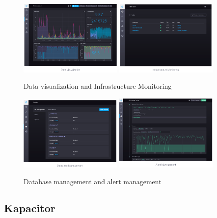 \documentclass{article}
\begin{document}
\begin{figure}[H]
    \centering
    \includegraphics[width=0.45\textwidth]{chronograf-data-visualization.png}
    \includegraphics[width=0.45\textwidth]{chronograf-infrastructure-monitoring.png}
    \caption{Data visualization and Infrastructure Monitoring}
\end{figure}

\begin{figure}[H]
    \centering
    \includegraphics[width=0.45\textwidth]{chronograf-database-management.png}
    \includegraphics[width=0.45\textwidth]{chronograf-alert-management.png}
    \caption{Database management and alert management}
\end{figure}

\subsection{Kapacitor}
\end{document}
